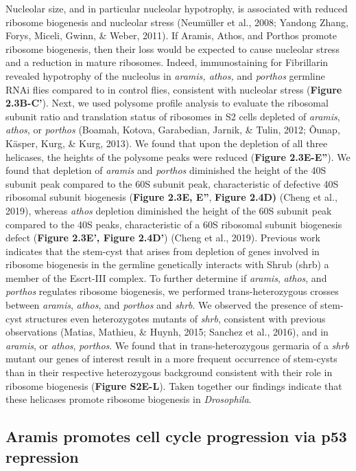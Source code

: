 \documentclass[12pt,oneside]{reedthesis}
\begin{document}
Nucleolar size, and in particular nucleolar hypotrophy, is associated
with reduced ribosome biogenesis and nucleolar stress (Neumüller et al., 2008; Yandong Zhang, Forys, Miceli, Gwinn, \& Weber, 2011). If Aramis, Athos, and Porthos
promote ribosome biogenesis, then their loss would be expected to cause
nucleolar stress and a reduction in mature ribosomes. Indeed,
immunostaining for Fibrillarin revealed hypotrophy of the nucleolus in
\emph{aramis, athos,} and \emph{porthos} germline RNAi flies compared to in
control flies, consistent with nucleolar stress (\textbf{Figure 2.3B-C'}).
Next, we used polysome profile analysis to evaluate the ribosomal
subunit ratio and translation status of ribosomes in S2 cells depleted
of \emph{aramis}, \emph{athos}, or \emph{porthos}
(Boamah, Kotova, Garabedian, Jarnik, \& Tulin, 2012; Õunap, Käsper, Kurg, \& Kurg, 2013).
We found that upon the depletion of all three helicases, the heights of
the polysome peaks were reduced (\textbf{Figure 2.3E-E''}). We found that
depletion of \emph{aramis} and \emph{porthos} diminished the height of the 40S
subunit peak compared to the 60S subunit peak, characteristic of
defective 40S ribosomal subunit biogenesis (\textbf{Figure 2.3E, E''}, \textbf{Figure 2.4D)} (Cheng et al., 2019),
whereas \emph{athos} depletion
diminished the height of the 60S subunit peak compared to the 40S peaks,
characteristic of a 60S ribosomal subunit biogenesis defect (\textbf{Figure 2.3E', Figure 2.4D'}) (Cheng et al., 2019).
Previous work indicates that the stem-cyst that arises from depletion of genes
involved in ribosome biogenesis in the germline genetically interacts
with Shrub (shrb) a member of the Escrt-III complex. To further
determine if \emph{aramis}, \emph{athos}, and \emph{porthos} regulates ribosome
biogenesis, we performed trans-heterozygous crosses between \emph{aramis},
\emph{athos}, and \emph{porthos} and \emph{shrb}. We observed the presence of stem-cyst
structures even heterozygotes mutants of \emph{shrb}, consistent with
previous observations (Matias, Mathieu, \& Huynh, 2015; Sanchez et al., 2016), and in
\emph{aramis}, or \emph{athos}, \emph{porthos}. We found that in trans-heterozygous
germaria of a \emph{shrb} mutant our genes of interest result in a more
frequent occurrence of stem-cysts than in their respective heterozygous
background consistent with their role in ribosome biogenesis (\textbf{Figure
S2E-L}). Taken together our findings indicate that these helicases
promote ribosome biogenesis in \emph{Drosophila}.

\hypertarget{aramis-promotes-cell-cycle-progression-via-p53-repression}{%
\subsection{Aramis promotes cell cycle progression via p53 repression}\label{aramis-promotes-cell-cycle-progression-via-p53-repression}}
\end{document}
